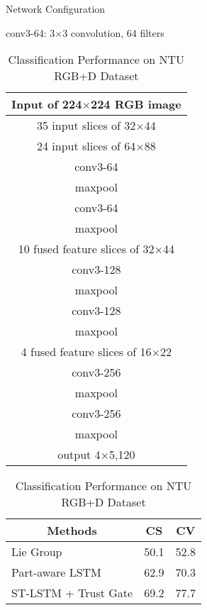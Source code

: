 \documentclass{bmvc2k}
\def \hfillx {\hspace*{-\textwidth} \hfill}
\begin{document}
\begin{table}[t]
	\footnotesize 
\begin{minipage}{0.4\textwidth}
			\centering \caption{Network Configuration}
		\label{tab:config}
		\begin{tablenotes}
			\scriptsize
			\item \hspace{0.3cm} conv3-64: 3$\times$3 convolution, 64 filters\\
		\end{tablenotes}
		\begin{tabular}{|c|}
			\hline
			Input of 224$\times$224 RGB image\\
			\hline
			35 input slices of 32$\times$44\\
			\hline
			24 input slices of 64$\times$88\\
			\hline
			conv3-64\\
			maxpool\\
			conv3-64\\
			maxpool\\
			\hline
			10 fused feature slices of 32$\times$44\\
			\hline
			conv3-128\\
			maxpool\\
			conv3-128\\
			maxpool\\
			\hline
			4 fused feature slices of 16$\times$22\\
			\hline
			conv3-256\\
			maxpool \\
			conv3-256\\
			maxpool \\
			\hline
			output 4$\times$5,120 \\
			\hline
		\end{tabular}
	\end{minipage}
	\hfillx
	\begin{minipage}{0.6\textwidth}
		\centering \caption{Classification Performance on NTU RGB+D Dataset}
		\label{tab:table1}
		\begin{tabular}{|l|r|r|}
			\hline
			\multicolumn{1}{|c|}{Methods} & \multicolumn{1}{c|}{CS}& \multicolumn{1}{c|}{CV}\\
			\hline
			Lie Group \cite{vemulapalli2014human} & 50.1 & 52.8\\
			Part-aware LSTM \cite{shahroudy2016ntu} & 62.9 & 70.3 \\
			ST-LSTM + Trust Gate \cite{liu2016spatio} & 69.2 & 77.7 \\

\end{tabular}
\end{minipage}
\end{table}
\end{document}
